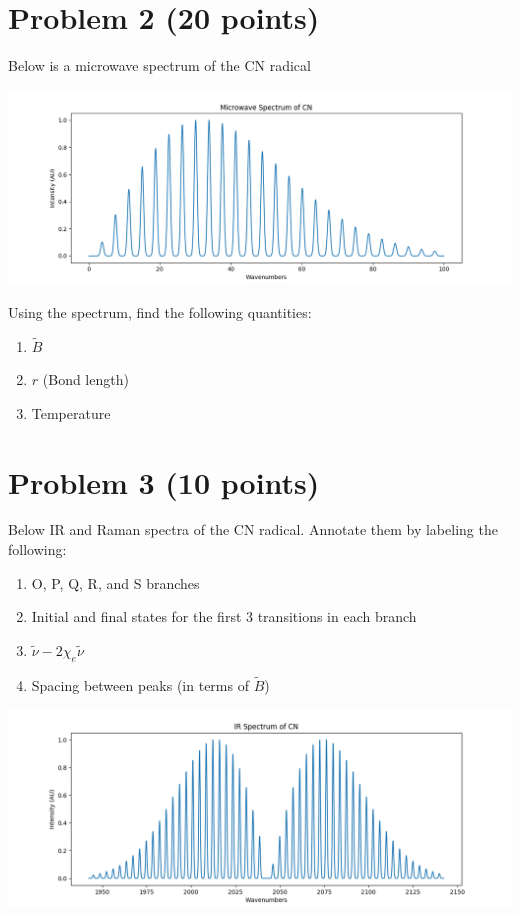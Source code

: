 \documentclass[10pt, letterpaper]{memoir}
\begin{document}
	\newpage
	\section*{Problem 2 (20 points)}
	Below is a microwave spectrum of the CN radical
	
	\noindent
	\includegraphics[trim= 40 0 40 0, clip=true, width=\linewidth]{CN_Microwave}
	
	\noindent
	Using the spectrum, find the following quantities:
	\begin{enumerate}
		\item $\tilde{B}$
		\item $r$ (Bond length)
		\item Temperature
	\end{enumerate}

	\newpage
	\section*{Problem 3 (10 points)}	
	Below IR and Raman spectra of the CN radical. Annotate them by labeling the following:
	\begin{enumerate}
		\item O, P, Q, R, and S branches
		\item Initial and final states for the first 3 transitions in each branch
		\item $\tilde{\nu} -2\chi_e\tilde{\nu}$
		\item Spacing between peaks (in terms of $\tilde{B}$)
	\end{enumerate}

	\noindent
	\includegraphics[trim= 60 0 60 0, clip=true, width=\linewidth]{CN_IR}
	
\end{document}
